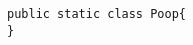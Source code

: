 \documentclass[a4paper]{article}
\begin{document}
\begin{lstlisting}[caption=Class]
public static class Poop{
}
\end{lstlisting}
\end{document}
